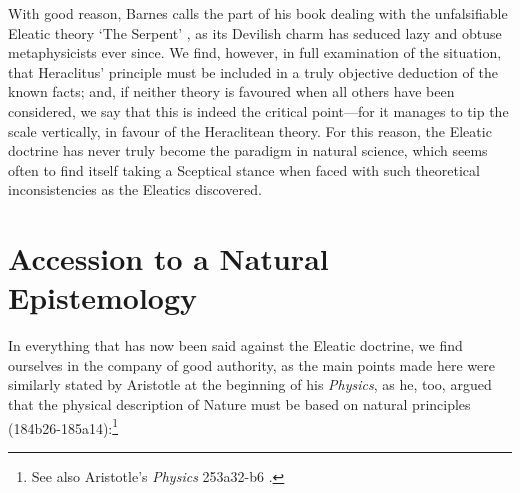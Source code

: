 With good reason, Barnes calls the part of his book dealing with the unfalsifiable Eleatic theory `The Serpent' \cite{Barnes1982}, as its Devilish charm has seduced lazy and obtuse metaphysicists ever since. We find, however, in full examination of the situation, that Heraclitus' principle must be included in a truly objective deduction of the known facts; and, if neither theory is favoured when all others have been considered, we say that this is indeed the critical point---for it manages to tip the scale vertically, in favour of the Heraclitean theory. For this reason, the Eleatic doctrine has never truly become the paradigm in natural science, which seems often to find itself taking a Sceptical stance when faced with such theoretical inconsistencies as the Eleatics discovered.
\section{Accession to a Natural Epistemology\label{sec_ANE}}
In everything that has now been said against the Eleatic doctrine, we find ourselves in the company of good authority, as the main points made here were similarly stated by Aristotle at the beginning of his \textit{Physics}, as he, too, argued that the physical description of Nature must be based on natural principles \cite{Aristotle1984} (184b26-185a14):\footnote{See also Aristotle's \textit{Physics} 253a32-b6 \cite{Aristotle1984}.}
